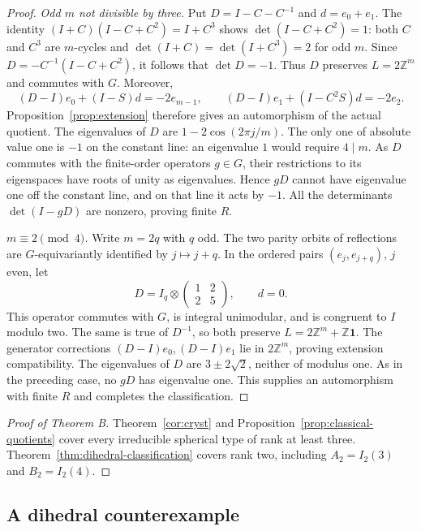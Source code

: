 \documentclass[11pt]{article}
\theoremstyle{definition}
\newcommand{\Z}{\mathbb{Z}}
\begin{document}
\begin{proof}
\emph{Odd $m$ not divisible by three.} Put $D=I-C-C^{-1}$ and $d=e_0+e_1$.
The identity $(I+C)(I-C+C^2)=I+C^3$ shows $\det(I-C+C^2)=1$:
both $C$ and $C^3$ are $m$-cycles and $\det(I+C)=\det(I+C^3)=2$ for odd $m$.
Since $D=-C^{-1}(I-C+C^2)$, it follows that $\det D=-1$.
Thus $D$ preserves $L=2\Z^m$ and commutes with $G$. Moreover,
\[
 (D-I)e_0+(I-S)d=-2e_{m-1},\qquad
 (D-I)e_1+(I-C^2S)d=-2e_2.
\]
Proposition~\ref{prop:extension} therefore gives an automorphism of the actual quotient.
The eigenvalues of $D$ are $1-2\cos(2\pi j/m)$. The only one of absolute value one is $-1$ on
the constant line: an eigenvalue $1$ would require $4\mid m$.
As $D$ commutes with the finite-order operators $g\in G$, their restrictions to its eigenspaces have
roots of unity as eigenvalues. Hence $gD$ cannot have eigenvalue one off the constant line, and on that
line it acts by $-1$. All the determinants $\det(I-gD)$ are nonzero, proving finite $R$.

\emph{$m\equiv2\pmod4$.} Write $m=2q$ with $q$ odd. The two parity orbits of reflections are
$G$-equivariantly identified by $j\mapsto j+q$. In the ordered pairs $(e_j,e_{j+q})$, $j$ even, let
\[
 D=I_q\otimes\begin{pmatrix}1&2\\2&5\end{pmatrix},\qquad d=0.
\]
This operator commutes with $G$, is integral unimodular, and is congruent to $I$ modulo two.
The same is true of $D^{-1}$, so both preserve $L=2\Z^m+\Z\mathbf1$.
The generator corrections $(D-I)e_0,(D-I)e_1$ lie in $2\Z^m$, proving extension compatibility.
The eigenvalues of $D$ are $3\pm2\sqrt2$, neither of modulus one. As in the preceding case, no $gD$
has eigenvalue one. This supplies an automorphism with finite $R$ and completes the classification.
\end{proof}

\begin{proof}[Proof of Theorem B]
Theorem~\ref{cor:cryst} and Proposition~\ref{prop:classical-quotients} cover every irreducible spherical
type of rank at least three. Theorem~\ref{thm:dihedral-classification} covers rank two, including
$A_2=I_2(3)$ and $B_2=I_2(4)$.
\end{proof}



\subsection{A dihedral counterexample}\label{sec:dihedral-counterexample}
\end{document}
